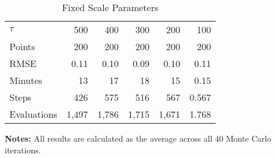 \begin{table}\onehalfspacing
\begin{center}
\begin{threeparttable}
  \captionsetup{width=30cm}
  \caption{Fixed Scale Parameters}
  \label{Fixed Scale Parameters}
  \begin{tabular}{lrrrrr}\toprule
  $\tau$ & 500 &  400 &   300 & 200  & 100\\
  Points      & 200 & 200 & 200  & 200 & 200\\
  \midrule
  RMSE        & 0.11 &   0.10 &    0.09 &  0.10  &  0.11\\
  Minutes     &  13 &      17 &    18 &   15 &  0.15\\
  Steps       &  426 &   575 &    516 &  567 &  0.567\\
  Evaluations & 1,497 &   1,786 &    1,715 &  1,671 &  1.768\\
  \bottomrule
  \end{tabular}\scriptsize
  \begin{tablenotes}\item \textbf{Notes:} All results are calculated as the average across all 40 Monte Carlo iterations.
\end{tablenotes}
  \end{threeparttable}
  \end{center}
\end{table}
